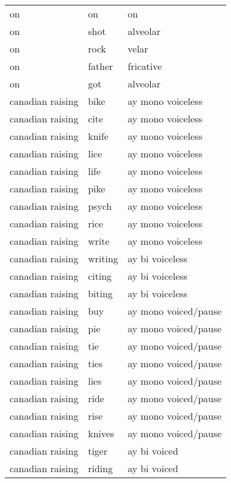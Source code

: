 \begin{longtable}{lll}
on               & on          & on                   \\
on               & shot        & alveolar             \\
on               & rock        & velar                \\
on               & father      & fricative            \\
on               & got         & alveolar             \\
canadian raising & bike        & ay mono voiceless    \\
canadian raising & cite        & ay mono voiceless    \\
canadian raising & knife       & ay mono voiceless    \\
canadian raising & lice        & ay mono voiceless    \\
canadian raising & life        & ay mono voiceless    \\
canadian raising & pike        & ay mono voiceless    \\
canadian raising & psych       & ay mono voiceless    \\
canadian raising & rice        & ay mono voiceless    \\
canadian raising & write       & ay mono voiceless    \\
canadian raising & writing     & ay bi voiceless      \\
canadian raising & citing      & ay bi voiceless      \\
canadian raising & biting      & ay bi voiceless      \\
canadian raising & buy         & ay mono voiced/pause \\
canadian raising & pie         & ay mono voiced/pause \\
canadian raising & tie         & ay mono voiced/pause \\
canadian raising & ties        & ay mono voiced/pause \\
canadian raising & lies        & ay mono voiced/pause \\
canadian raising & ride        & ay mono voiced/pause \\
canadian raising & rise        & ay mono voiced/pause \\
canadian raising & knives      & ay mono voiced/pause \\
canadian raising & tiger       & ay bi voiced         \\
canadian raising & riding      & ay bi voiced         \\

\end{longtable}
